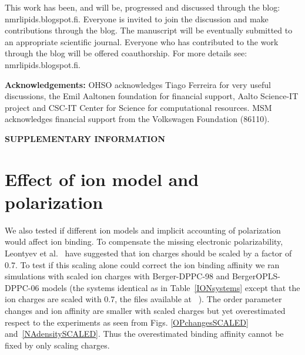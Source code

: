\documentclass[pre,aps,floatfix,authordate1-4,twocolumn]{revtex4-1}
\begin{document}

This work has been, and will be, progressed and discussed through the blog: nmrlipids.blogspot.fi. 
Everyone is invited to join the discussion and make contributions through the blog. 
The manuscript will be eventually submitted to an appropriate scientific journal. 
Everyone who has contributed to the work through the blog will be offered 
coauthorship. For more details see: nmrlipids.blogspot.fi.   

{\bf Acknowledgements: }
OHSO acknowledges Tiago Ferreira for very useful discussions, the Emil Aaltonen foundation for financial support, Aalto Science-IT project and CSC-IT Center for Science for computational resources. 
%
MSM acknowledges financial support from the Volkswagen Foundation (86110).

\newpage

\appendix
\begin{center}
{\bf SUPPLEMENTARY INFORMATION}
\end{center}

\section{Effect of ion model and polarization}

 We also tested if different ion models and implicit accounting of polarization would affect ion binding.
To compensate the missing electronic polarizability, Leontyev et al.~\cite{leontyev11} have suggested
that ion charges should be scaled by a factor of 0.7. To test if this scaling alone could correct the ion
binding affinity we ran simulations with scaled ion charges with Berger-DPPC-98 and BergerOPLS-DPPC-06 models 
(the systems identical as in Table~\ref{IONsystems} except that the ion charges are scaled with 0.7, the files available 
at ~\cite{DPPCBergerNaCl150mMscaled,DPPCBergerNaCl1000mMscaled,DPPCBergerOPLS06NaCl150mMscaled,DPPCBergerOPLS06NaCl1000mMscaled}). 
The order parameter changes and ion affinity are smaller with scaled charges but yet overestimated respect to
the experiments as seen from Figs. \ref{OPchangesSCALED} and~\ref{NAdensitySCALED}. Thus the overestimated
binding affinity cannot be fixed by only scaling charges.
\end{document}
